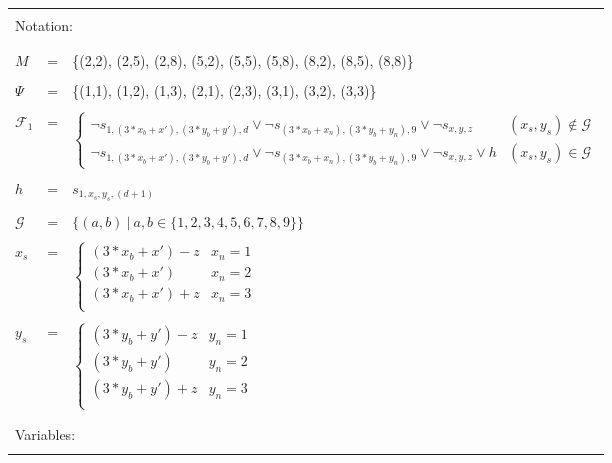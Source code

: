 \begin{table}
    \centering
    \begin{tabular*}{\textwidth}{m{1.5em} c l}
    \hline
    \\
    \multicolumn{3}{l}{Notation:}\\
    \\
    \hline
    \\
    $M$             &= &\{(2,2), (2,5), (2,8), (5,2), (5,5), (5,8), (8,2), (8,5), (8,8)\}\\
    \\
    $\Psi$          &= &\{(1,1), (1,2), (1,3), (2,1), (2,3), (3,1), (3,2), (3,3)\}\\
    \\
    $\mathcal{F}_1$   &= &$\begin{cases}
    \neg s_{1,(3*x_b+x'),(3*y_b+y'),d} \lor \neg s_{(3*x_b+x_n),(3*y_b+y_n),9} \lor \neg s_{x,y,z}  & (x_s,y_s) \notin \mathcal{G} \\
    \neg s_{1,(3*x_b+x'),(3*y_b+y'),d} \lor \neg s_{(3*x_b+x_n),(3*y_b+y_n),9} \lor \neg s_{x,y,z}  \lor h& (x_s,y_s) \in \mathcal{G}
    \end{cases}$\\
    \\
    $h$             &= & $s_{1,x_s,y_s,(d+1)}$\\
    \\
    $\mathcal{G}$   &= & $\{(a,b)~|~a,b\in \{1,2,3,4,5,6,7,8,9\}\}$\\
    \\
    $x_s$           &= &$\begin{cases}
    (3*x_b+x')-z    & x_n = 1 \\
    (3*x_b+x')      & x_n = 2 \\
    (3*x_b+x')+z    & x_n = 3 \\
    \end{cases}$\\
    \\
    $y_s$           &= &$\begin{cases}
    (3*y_b+y')-z    & y_n = 1 \\
    (3*y_b+y')      & y_n = 2 \\
    (3*y_b+y')+z    & y_n = 3 \\
    \end{cases}$\\
    \\
    \hline
    \\
    \multicolumn{3}{l}{Variables:}\\
    \\

\end{tabular*}
\end{table}
